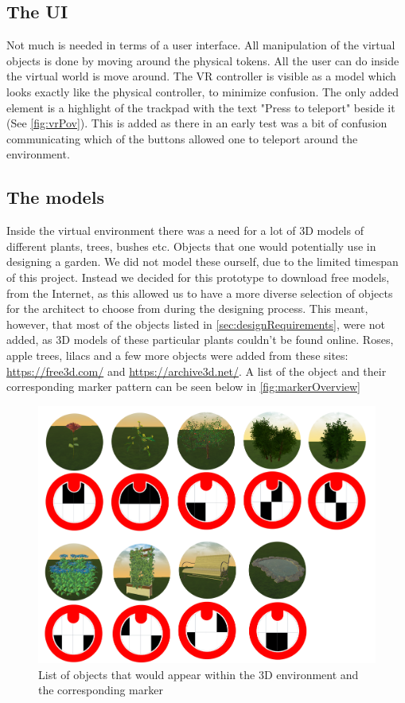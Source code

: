 \subsection{The UI}
Not much is needed in terms of a user interface. All manipulation of the virtual objects is done by moving around the physical tokens. All the user can do inside the virtual world is move around. The VR controller is visible as a model which looks exactly like the physical controller, to minimize confusion. The only added element is a highlight of the trackpad with the text "Press to teleport" beside it (See \autoref{fig:vrPov}). This is added as there in an early test was a bit of confusion communicating which of the buttons allowed one to teleport around the environment.

\subsection{The models}
Inside the virtual environment there was a need for a lot of 3D models of different plants, trees, bushes etc. Objects that one would potentially use in designing a garden. We did not model these ourself, due to the limited timespan of this project. Instead we decided for this prototype to download free models, from the Internet, as this allowed us to have a more diverse selection of objects for the architect to choose from during the designing process. This meant, however, that most of the objects listed in \autoref{sec:designRequirements}, were not added, as 3D models of these particular plants couldn't be found online. Roses, apple trees, lilacs and a few more objects were added from these sites: \url{https://free3d.com/} and \url{https://archive3d.net/}. A list of the object and their corresponding marker pattern can be seen below in \autoref{fig:markerOverview}

\begin{figure}[H]
	\centering
	\includegraphics[width=0.9\linewidth]{figure/Appendices/markersOverview.png}
	\caption{List of objects that would appear within the 3D environment and the corresponding marker}
	\label{fig:markerOverview}
\end{figure}








